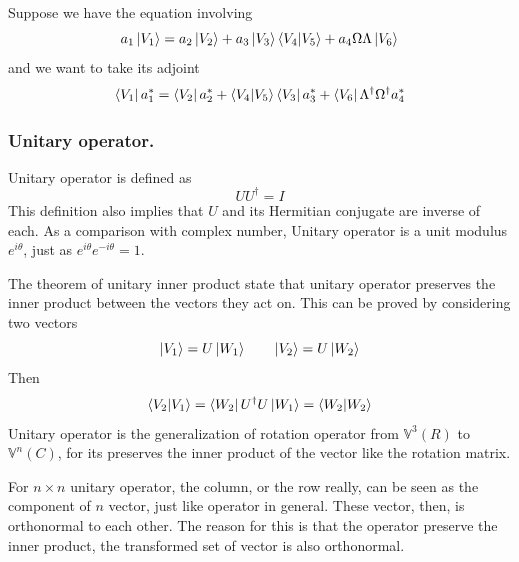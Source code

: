 \documentclass[../../../main.tex]{subfiles}
\begin{document}
Suppose we have the equation involving
\begin{equation*}
	a_1 \ket{V_1}=a_2 \ket{V_2}+a_3 \ket{V_3}\braket{V_4|V_5}+a_4\Omega\Lambda \ket{V_6}
\end{equation*}
and we want to take its adjoint
\begin{equation*}
	\bra{V_1}a_1 ^*=\bra{V_2}a_2 ^*+\braket{V_4|V_5}\bra{V_3}a_3 ^*+\bra{V_6}\Lambda ^\dagger\Omega ^\dagger a_4 ^*
\end{equation*}

\subsubsection{Unitary operator.}
Unitary operator is defined as
\begin{equation*}
	UU ^\dagger=I
\end{equation*}
This definition also implies that $U$ and its Hermitian conjugate are inverse of each.
As a comparison with complex number, Unitary operator is a unit modulus $e^{i\theta}$, just as $e^{i\theta}e^{-i\theta}=1$.

The theorem of unitary inner product state that unitary operator preserves the inner product between the vectors they act on.
This can be proved by considering two vectors
\begin{equation*}
	\ket{V_1}=U \ket{W_1}\qquad \ket{V_2}=U \ket{W_2}
\end{equation*}
Then
\begin{equation*}
	\braket{V_2|V_1}=\bra{W_2}U ^\dagger U \ket{W_1}=\braket{W_2|W_2}
\end{equation*}
Unitary operator is the generalization of rotation operator from $\mathbb{V}^3(R)$ to $\mathbb{V}^n(C)$, for its preserves the inner product of the vector like the rotation matrix.

For $n\times n$ unitary operator, the column, or the row really, can be seen as the component of $n$ vector, just like operator in general.
These vector, then, is orthonormal to each other.
The reason for this is that the operator preserve the inner product, the transformed set of vector is also orthonormal.
\end{document}

